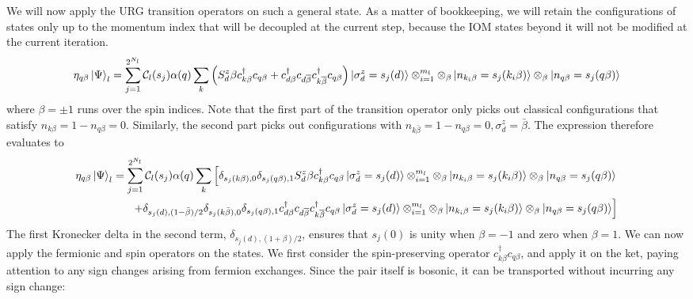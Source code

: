 \documentclass[prb]{revtex4-2}
\begin{document}
We will now apply the URG transition operators on such a general state. As a matter of bookkeeping, we will retain the configurations of states only up to the momentum index that will be decoupled at the current step, because the IOM states beyond it will not be modified at the current iteration.
\begin{equation}\begin{aligned}
	\eta_{q\beta} \ket{\Psi}_l = \sum_{j=1}^{2^{N_l}} \mathcal{C}_l(s_j) \alpha(q)\sum_{k} \left( S_d^z \beta c^\dagger_{k\beta}c_{q\beta} + c^\dagger_{d\beta}c_{d\overline\beta}c^\dagger_{k\overline\beta}c_{q\beta}\right) \ket{\sigma^z_d=s_j(d)}\otimes_{i=1}^{m_l}\otimes_{\beta}\ket{n_{k_i\beta}=s_j(k_i\beta) }\otimes_{\beta}\ket{n_{q\beta}=s_j(q\beta)}
\end{aligned}\end{equation}
where \(\beta = \pm 1\) runs over the spin indices. Note that the first part of the transition operator only picks out classical configurations that satisfy \(n_{k\beta} = 1 - n_{q\beta} = 0\). Similarly, the second part picks out configurations with \(n_{k\bar\beta} = 1 - n_{q\beta} = 0, \sigma_d^z = \bar\beta\). The expression therefore evaluates to 
\begin{equation}\begin{aligned}
	\eta_{q\beta} \ket{\Psi}_l = \sum_{j=1}^{2^{N_l}} \mathcal{C}_l(s_j) \alpha(q)\sum_{k} \left[ \delta_{s_j(k\beta),0}\delta_{s_j(q\beta),1} S_d^z \beta c^\dagger_{k\beta}c_{q\beta} \ket{\sigma^z_d=s_j(d)}\otimes_{i=1}^{m_l}\otimes_{\beta}\ket{n_{k_i\beta}=s_j(k_i\beta) }\otimes_{\beta}\ket{n_{q\beta}=s_j(q\beta)} \right.\\
	\left.+ \delta_{s_j(d),(1 - \bar\beta)/2}\delta_{s_j(k\bar\beta),0}\delta_{s_j(q\beta),1}c^\dagger_{d\beta}c_{d\overline\beta}c^\dagger_{k\overline\beta}c_{q\beta} \ket{\sigma^z_d=s_j(d)}\otimes_{i=1}^{m_l}\otimes_{\beta}\ket{n_{k_i\beta}=s_j(k_i\beta) }\otimes_{\beta}\ket{n_{q\beta}=s_j(q\beta)}\right]
\end{aligned}\end{equation}
The first Kronecker delta in the second term, \(\delta_{s_j(d),(1 + \beta)/2}\), ensures that \(s_j(0)\) is unity when \(\beta = -1\) and zero when \(\beta = 1\). We can now apply the fermionic and spin operators on the states. We first consider the spin-preserving operator \(c^\dagger_{k \beta}c_{q \beta}\), and apply it on the ket, paying attention to any sign changes arising from fermion exchanges. Since the pair itself is bosonic, it can be transported without incurring any sign change:
\end{document}
